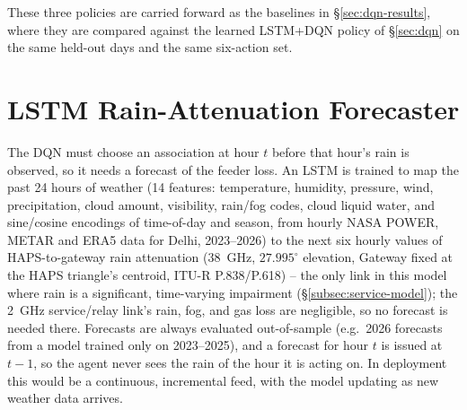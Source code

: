 \documentclass[]{ieeeaccess}
\begin{document}
These three policies are carried forward as the baselines in \S\ref{sec:dqn-results}, where they are compared against the learned LSTM+DQN policy of \S\ref{sec:dqn} on the same held-out days and the same six-action set.

\section{LSTM Rain-Attenuation Forecaster}
\label{sec:lstm}

The DQN must choose an association at hour $t$ before that hour's rain is observed, so it needs a forecast of the feeder loss. An LSTM is trained to map the past 24 hours of weather (14 features: temperature, humidity, pressure, wind, precipitation, cloud amount, visibility, rain/fog codes, cloud liquid water, and sine/cosine encodings of time-of-day and season, from hourly NASA POWER, METAR and ERA5 data for Delhi, 2023--2026) to the next six hourly values of HAPS-to-gateway rain attenuation (38~GHz, $27.995^\circ$ elevation, Gateway fixed at the HAPS triangle's centroid, ITU-R P.838/P.618) -- the only link in this model where rain is a significant, time-varying impairment (\S\ref{subsec:service-model}); the 2~GHz service/relay link's rain, fog, and gas loss are negligible, so no forecast is needed there. Forecasts are always evaluated out-of-sample (e.g.\ 2026 forecasts from a model trained only on 2023--2025), and a forecast for hour $t$ is issued at $t-1$, so the agent never sees the rain of the hour it is acting on. In deployment this would be a continuous, incremental feed, with the model updating as new weather data arrives.
\end{document}
